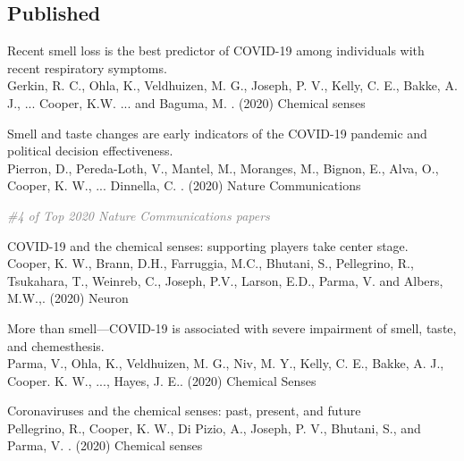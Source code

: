 \documentclass[10pt]{cooperCV2}
\begin{document}
\subsection{Published} 
\begin{etaremune}[resume,itemindent=-1.5\bibhang, topsep=0pt,
				   itemsep=\bibsep,partopsep=0pt,parsep=0pt,leftmargin={\bibhang+\widthof{[999]}}] 
    
    \item Recent smell loss is the best predictor of COVID-19 among individuals with recent respiratory symptoms. \\
     Gerkin, R. C., Ohla, K., Veldhuizen, M. G., Joseph, P. V., Kelly, C. E., Bakke, A. J., ... Cooper, K.W. ... and Baguma, M. . (2020) Chemical senses 
     
	
    \item Smell and taste changes are early indicators of the COVID-19 pandemic and political decision effectiveness. \\
     Pierron, D., Pereda-Loth, V., Mantel, M., Moranges, M., Bignon, E., Alva, O.,  Cooper, K. W., ... Dinnella, C. . (2020) Nature Communications 
     
     	\begin{innerlist}
     	
	     \item  \textcolor{grey}{\textit{\#4 of Top 2020 Nature Communications papers} }
     	
     	\end{innerlist}
     
	
    \item COVID-19 and the chemical senses: supporting players take center stage. \\
     Cooper, K. W., Brann, D.H., Farruggia, M.C., Bhutani, S., Pellegrino, R., Tsukahara, T., Weinreb, C., Joseph, P.V., Larson, E.D., Parma, V. and Albers, M.W.,. (2020) Neuron 
     
	
    \item More than smell—COVID-19 is associated with severe impairment of smell, taste, and chemesthesis. \\
     Parma, V., Ohla, K., Veldhuizen, M. G., Niv, M. Y., Kelly, C. E., Bakke, A. J., Cooper. K. W., ..., Hayes, J. E.. (2020) Chemical Senses 
     
	
    \item Coronaviruses and the chemical senses: past, present, and future \\
     Pellegrino, R., Cooper, K. W., Di Pizio, A., Joseph, P. V., Bhutani, S., and Parma, V. . (2020) Chemical senses 
     

\end{etaremune}
\end{document}
